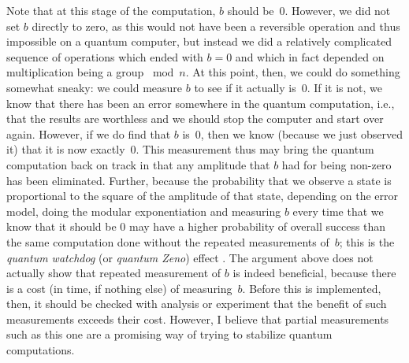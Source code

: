 Note that at this stage of the computation, $b$ should be~0.  
However, we did not set
$b$ directly to zero, as this would not have been a reversible
operation and thus impossible on a quantum computer,
but instead we did a relatively complicated sequence
of operations which ended with $b=0$ and which in fact depended on 
multiplication being a group $\bmod{n}$.  At
this point, then, we could do something somewhat sneaky: we could
measure $b$ to see if it actually is~0.  If it is not, we know that
there has been an error somewhere in the quantum computation, 
i.e., that the results are worthless and we should stop the computer 
and start over again.  However, if we do find that $b$ is~0, then we know 
(because we just observed it) that it is now exactly~0.  This 
measurement thus may bring the quantum computation back on track 
in that any amplitude that $b$ had for being non-zero has been
eliminated.  Further, because the probability that we observe a state 
is proportional to the square of the amplitude of that state, depending
on the error model, doing the 
modular exponentiation and measuring $b$ every time that we know 
that it should be 0 may have a higher probability of overall success
than the same computation done without the repeated measurements of~$b$; 
this is the {\em quantum watchdog} (or {\em quantum Zeno}) effect 
\cite{Pere2}.  
The argument above does not actually show that repeated measurement of
$b$ is indeed beneficial, because there is a cost (in time, if nothing
else) of measuring~$b$.  Before this is implemented, then, it should 
be checked with analysis or experiment that the benefit of 
such measurements exceeds their cost.  However, I believe that 
partial measurements such as this one are a promising way of trying 
to stabilize quantum computations.

